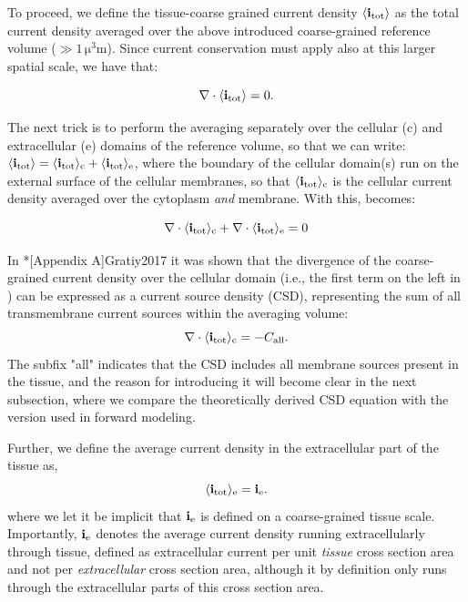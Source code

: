 To proceed, we define the tissue-coarse grained current density $\left<{\bf i}_\text{tot}\right>$ 
as the total current density averaged over the above introduced coarse-grained reference volume
($\gg 1 \, \si{\cubic\micro\metre}$). 
Since current conservation must apply also at this larger spatial scale, we have that:

\begin{equation}
{\bf \nabla} \cdot \langle{\bf i}_\text{tot}\rangle = 0.
\label{eq:VC:Sergey2}
\end{equation}

The next trick is to perform the averaging separately over 
the cellular (c) and extracellular (e) domains of the reference volume, so that we can write: 
$\langle{\bf i}_\text{tot}\rangle = \langle{\bf i}_\text{tot}\rangle_\text{c} + \langle{\bf i}_\text{tot}\rangle_\text{e}$, 
where the boundary of the cellular domain(s) run on the external surface of the cellular membranes,
so that $\langle{\bf i}_\text{tot}\rangle_\text{c}$ is the cellular current density averaged over the cytoplasm \emph{and} membrane. With this,  becomes: 

\begin{equation}
{\bf \nabla} \cdot \langle{\bf i}_\text{tot}\rangle_\text{c}  + {\bf \nabla}\cdot \langle{\bf i}_\text{tot}\rangle_\text{e} = 0
\label{eq:VC:Sergey3}
\end{equation}

In \citeasnoun**[Appendix A]{Gratiy2017} it was shown that the divergence of the coarse-grained current density 
over the cellular domain (i.e., the first term on the left in ) 
can be expressed as a current source density (CSD), representing the
sum of all transmembrane current sources within the averaging volume: 
\begin{equation}
{\bf \nabla} \cdot \langle{\bf i}_\text{tot}\rangle_\text{c}  = - C_\mathrm{all}.
\label{eq:VC:Sergey4}
\end{equation}
The subfix "all" indicates that the CSD includes all membrane sources present in the tissue, 
and the reason for introducing it will become clear in the next subsection, where we compare 
the theoretically derived CSD equation with the version used in forward modeling. 

Further, we define the average current density in the extracellular part of the tissue as, 
\begin{equation}
\langle{\bf i}_\text{tot}\rangle_\text{e} = {\bf i}_\text{e}.
\label{eq:VC:Sergey5}
\end{equation}
where we let it be implicit that ${\bf i}_\text{e}$ is defined on a coarse-grained tissue scale. 
Importantly, ${\bf i}_\text{e}$ denotes the average current density running extracellularly through tissue, 
defined as extracellular current per unit \textit{tissue} cross section area 
and not per \textit{extracellular} cross section area, 
although it by definition only runs through the extracellular parts of this cross section area.


